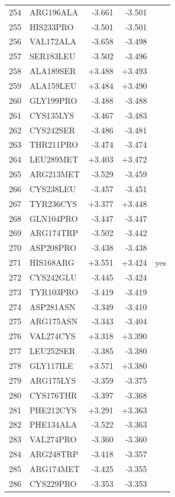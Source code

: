 \begin{longtable}{r l r r c}
254 & ARG196ALA & -3.661 & -3.501 &  \\
255 & HIS233PRO & -3.501 & -3.501 &  \\
256 & VAL172ALA & -3.658 & -3.498 &  \\
257 & SER183LEU & -3.502 & -3.496 &  \\
258 & ALA189SER & +3.488 & +3.493 &  \\
259 & ALA159LEU & +3.484 & +3.490 &  \\
260 & GLY199PRO & -3.488 & -3.488 &  \\
261 & CYS135LYS & -3.467 & -3.483 &  \\
262 & CYS242SER & -3.486 & -3.481 &  \\
263 & THR211PRO & -3.474 & -3.474 &  \\
264 & LEU289MET & +3.403 & +3.472 &  \\
265 & ARG213MET & -3.529 & -3.459 &  \\
266 & CYS238LEU & -3.457 & -3.451 &  \\
267 & TYR236CYS & +3.377 & +3.448 &  \\
268 & GLN104PRO & -3.447 & -3.447 &  \\
269 & ARG174TRP & -3.502 & -3.442 &  \\
270 & ASP208PRO & -3.438 & -3.438 &  \\
271 & HIS168ARG & +3.551 & +3.424 & yes \\
272 & CYS242GLU & -3.445 & -3.424 &  \\
273 & TYR103PRO & -3.419 & -3.419 &  \\
274 & ASP281ASN & -3.349 & -3.410 &  \\
275 & ARG175ASN & -3.343 & -3.404 &  \\
276 & VAL274CYS & +3.318 & +3.390 &  \\
277 & LEU252SER & -3.385 & -3.380 &  \\
278 & GLY117ILE & +3.571 & +3.380 &  \\
279 & ARG175LYS & -3.359 & -3.375 &  \\
280 & CYS176THR & -3.397 & -3.368 &  \\
281 & PHE212CYS & +3.291 & +3.363 &  \\
282 & PHE134ALA & -3.522 & -3.363 &  \\
283 & VAL274PRO & -3.360 & -3.360 &  \\
284 & ARG248TRP & -3.418 & -3.357 &  \\
285 & ARG174MET & -3.425 & -3.355 &  \\
286 & CYS229PRO & -3.353 & -3.353 &  \\

\end{longtable}
